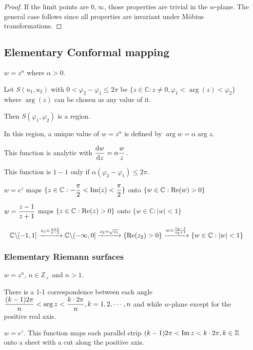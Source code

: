 \begin{proof}
    If the limit points are  $ 0,\infty $, those properties are trivial in the  $ w $-plane. The general case follows since all properties are invariant under M{\"o}bius transformations.
\end{proof}
\subsection{Elementary Conformal mapping}
\begin{example}
    $ w=z^\alpha $ where  $ \alpha>0 $.
    
    Let  $ S(u_1,u_2) $ with  $ 0<\varphi_2-\varphi_1 \leq 2\pi $ be  $ \{z\in \mathbb{C}:z\neq0,\varphi_1<\arg(z)<\varphi_2\} $ where  $ \arg(z) $ can be chosen as any value of it.   

    Then  $ S(\varphi_1,\varphi_2) $ is a region.
    
    In this region, a unique value of  $ w=z^\alpha $ is defined by  $ \arg w=\alpha\arg z $.
    
    This function is analytic with  $ \displaystyle\frac{\mathrm{d}w}{\mathrm{d}z}=\alpha\displaystyle\frac{w}{z} $.
    
    This function is  $ 1-1 $ only if  $ \alpha(\varphi_2-\varphi_1) \leq 2\pi $.  
\end{example}
\begin{example}
    $ w=e^z  $  maps  $ \{z\in \mathbb{C}:\displaystyle-\frac{\pi }{2}<\operatorname{Im}(z)<\frac{\pi}{2}\} $ onto  $ \{w\in\mathbb{C}:\mathrm{Re}( w)>0\} $ 
\end{example}
\begin{example}
    $ w=\displaystyle\frac{z-1}{z+1} $ maps  $ \{z\in \mathbb{C}:\mathrm{Re}(z)>0\} $ onto  $ \{w\in \mathbb{C}:|w|<1\} $   
\end{example}
\begin{example}
    \begin{equation}
        \mathbb{C}\backslash[-1,1]\xrightarrow{z_1=\frac{z+1}{z-1}}\mathbb{C}\backslash(-\infty,0]\xrightarrow{z_2=\sqrt{z_1}}\{\mathrm{Re}(z_2)>0\}\xrightarrow{w=\frac{z_2-1}{z_2+1}}\{w\in\mathbb{C}:|w|<1\}
    \end{equation}
\end{example}
\subsubsection{Elementary Riemann surfaces}
\begin{example}
    $ w=z^n $,  $ n\in \mathbb{Z}_+ $ and  $ n>1 $.
    
    There is a 1-1 correspondence between each angle  $ \displaystyle\frac{(k-1)2\pi}{n}<\arg z<\frac{k\cdot 2\pi}{n},k=1,2,\cdots,n $ and while  $ w $-plane except for the positive real axis.  
\end{example}
\begin{example}
    $ w=e^z $. This function maps each parallel strip $ (k-1)2\pi<\operatorname{Im} z<k\cdot 2\pi, k\in \mathbb{Z} $ onto a sheet with a  cut along the positive axis.
\end{example}
